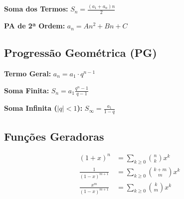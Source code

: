 \textbf{Soma dos Termos:} \quad $ S_n = \frac{(a_1 + a_n)n}{2} $

\textbf{PA de 2ª Ordem:} \quad $ a_n = An^2 + Bn + C $

\subsection{Progressão Geométrica (PG)}

\textbf{Termo Geral:} \quad $ a_n = a_1 \cdot q^{n-1} $

\textbf{Soma Finita:} \quad $ S_n = a_1 \frac{q^n - 1}{q - 1} $

\textbf{Soma Infinita ($|q|<1$):} \quad $ S_{\infty} = \frac{a_1}{1 - q} $


\subsection{Funções Geradoras}

\begin{align*}
    (1+x)^n &= \sum_{k\ge 0} \binom{n}{k} x^k \\[6pt]
    \frac{1}{(1-x)^{m+1}} &= \sum_{k\ge 0} \binom{k+m}{m} x^k \\[6pt]
    \frac{x^m}{(1-x)^{m+1}} &= \sum_{k\ge 0} \binom{k}{m} x^k
\end{align*}
